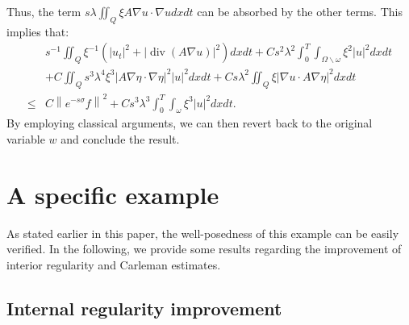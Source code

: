 \documentclass[9pt,reqno]{amsart}
\theoremstyle{plain}
\numberwithin{equation}{section}
\numberwithin{theorem}{section}
\def\Om{\Omega}
\DeclareMathOperator*{\Div}{\mathrm{div}}
\def\Om{\Omega}
\begin{document}
	Thus, the term $s \lambda \iint_Q \xi A \nabla u \cdot \nabla udx d t$ can be absorbed by the other terms. This implies that:
	\begin{equation}\label{LLU5}
		\begin{split}
			&s^{-1}\iint_{Q} \xi^{-1} (|u_t |^2 + \left|\Div(A\nabla u)\right|^2) dx dt +C s^2 \lambda^2 \int_0^T \int_{\Om\backslash \omega} \xi^{2}|u|^2dx  d t\\
			&+C\iint_Q s^3 \lambda^4 \xi^3\left|A \nabla \eta \cdot \nabla \eta \right|^2|u|^2 dx dt  + C s  \lambda^2 \iint_Q\xi|\nabla u \cdot A \nabla \eta|^2 dx  d t\\
			\leq& C\left\|e^{-s \sigma} f\right\|^2
			+Cs^3 \lambda^3 \int_0^T \int_{\omega} \xi^3|u|^2dx  d t.
		\end{split}
	\end{equation}
	By employing classical arguments, we can then revert back to the original variable $w$ and conclude the result.
	
	\section{A specific example}
	
	
	As stated earlier in this paper, the well-posedness of this example can be easily verified. In the following, we provide some results regarding the improvement of interior regularity and Carleman estimates.
	\subsection{Internal regularity improvement}
	
	\hspace*{\fill}\\
	
\end{document}
